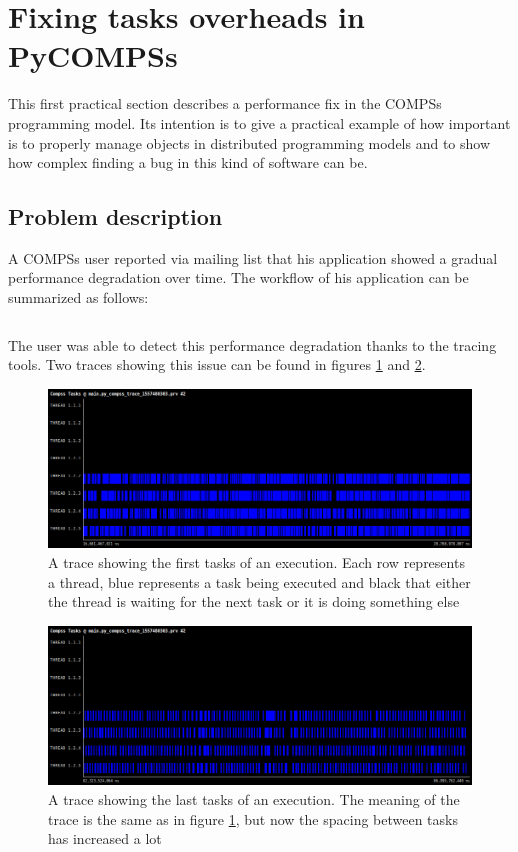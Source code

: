 \newpage
\section{Fixing tasks overheads in PyCOMPSs}
\label{sec:task_overhead}
This first practical section describes a performance fix in the COMPSs programming model. Its intention is to give a practical example of how important is to properly manage objects in distributed programming models and to show how complex finding a bug in this kind of software can be.

\subsection{Problem description}
A COMPSs user reported via mailing list that his application showed a gradual performance degradation over time. The workflow of his application can be summarized as follows:

\inputminted{python}{applications/TASK_OVERHEAD/main.py}

The user was able to detect this performance degradation thanks to the tracing tools. Two traces showing this issue can be found in figures \ref{fig:zoom_task_early} and \ref{fig:zoom_task_late}.

\begin{figure}
\centering
\includegraphics[scale = 0.3]{figures/zoom_task_early.png}
\caption{A trace showing the first tasks of an execution. Each row represents a thread, blue represents a task being executed and black that either the thread is waiting for the next task or it is doing something else}
\label{fig:zoom_task_early}
\end{figure}

\begin{figure}
\centering
\includegraphics[scale = 0.3]{figures/zoom_task_late.png}
\caption{A trace showing the last tasks of an execution. The meaning of the trace is the same as in figure \ref{fig:zoom_task_early}, but now the spacing between tasks has increased a lot}
\label{fig:zoom_task_late}
\end{figure}


